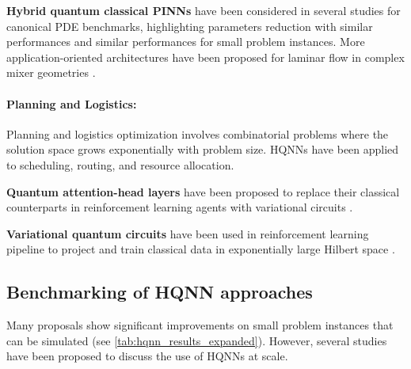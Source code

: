 \documentclass[aps,10pt,groupedaddress,prx,superscriptaddress,twocolumn,balancelastpage, tightenlines]{revtex4-2}
\theoremstyle{plain}  %
\begin{document}
\noindent\textbf{Hybrid quantum classical PINNs} have been considered in several studies \cite{xiao2024piqnn, trahan2024qpinn, siegl2024piqc,farea2025qcpinn, song2025nisqcfd,berger2025teqpinn, marcandelli2025phqfno}  for canonical \gls{PDE} benchmarks, highlighting parameters reduction with similar performances and similar performances for small problem instances. More application-oriented architectures have been proposed for laminar flow in complex mixer geometries \cite{sedykh2024hybrid}.




\paragraph{Planning and Logistics:} Planning and logistics optimization involves combinatorial problems where the solution space grows exponentially with problem size. HQNNs have been applied to scheduling, routing, and resource allocation.

\noindent\textbf{Quantum attention-head layers} have been proposed to replace their classical counterparts in reinforcement learning agents with variational circuits \cite{sanches2022short, correll2023qnn}.

\noindent\textbf{Variational quantum circuits} have been used in reinforcement learning pipeline to project and train classical data in exponentially large Hilbert space \cite{haboury2023supervised, rainjonneau2023quantum, jahin2023qamplifynet, princy2025hqerl}.

\begin{table}[t!]
\centering
\caption{Consolidated empirical results for HQNNs across application domains.
    "Param.\ Red." indicates parameter reduction relative to classical
    baselines achieving comparable accuracy. "Sim." denotes classical
    simulator; "QPU" denotes execution on quantum hardware. Dashes indicate
    metrics not reported.}
\label{tab:hqnn_results_expanded}
\scriptsize
\setlength{\tabcolsep}{2pt}
\renewcommand{\arraystretch}{1.0}

\end{table}



\subsection{Benchmarking of HQNN approaches}
\label{subsubsec:performance_summary}

Many proposals show significant improvements on small problem instances that can be simulated (see \autoref{tab:hqnn_results_expanded}). However, several studies have been proposed to discuss the use of HQNNs at scale. 
\end{document}

